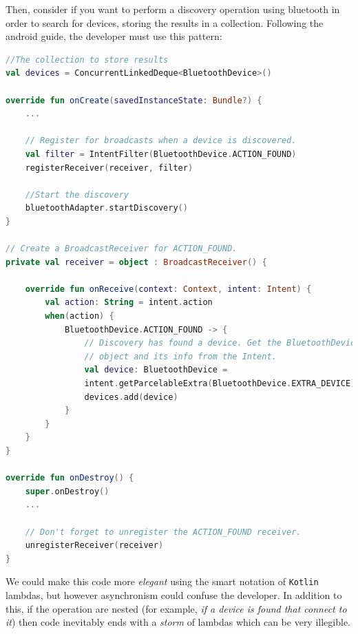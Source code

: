 Then, consider if you want to perform a discovery operation using bluetooth in order to search for devices, storing the results in a collection. Following the android guide, the developer must use this pattern:

\begin{lstlisting}[language=Kotlin]
//The collection to store results
val devices = ConcurrentLinkedDeque<BluetoothDevice>()
	
override fun onCreate(savedInstanceState: Bundle?) {
	...
	
	// Register for broadcasts when a device is discovered.
	val filter = IntentFilter(BluetoothDevice.ACTION_FOUND)
	registerReceiver(receiver, filter)
	
	//Start the discovery
	bluetoothAdapter.startDiscovery()
}

// Create a BroadcastReceiver for ACTION_FOUND.
private val receiver = object : BroadcastReceiver() {
	
	override fun onReceive(context: Context, intent: Intent) {
		val action: String = intent.action
		when(action) {
			BluetoothDevice.ACTION_FOUND -> {
				// Discovery has found a device. Get the BluetoothDevice
				// object and its info from the Intent.
				val device: BluetoothDevice =
				intent.getParcelableExtra(BluetoothDevice.EXTRA_DEVICE)
				devices.add(device)
			}
		}
	}
}

override fun onDestroy() {
	super.onDestroy()
	...
	
	// Don't forget to unregister the ACTION_FOUND receiver.
	unregisterReceiver(receiver)
}
\end{lstlisting}

We could make this code more \textit{elegant} using the smart notation of \texttt{Kotlin} lambdas, but however asynchronism could confuse the developer. In addition to this, if the operation are nested (for example, \textit{if a device is found that connect to it}) then code inevitably ends with a \textit{storm} of lambdas which can be very illegible.

